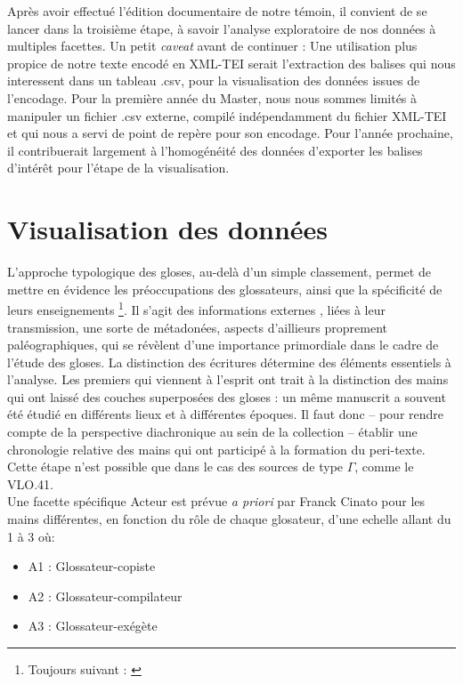 \documentclass[a4paper, twoside, 12pt]{book}
\begin{document}
Après avoir effectué l'édition documentaire de notre témoin, il convient de se lancer dans la troisième étape, à savoir l'analyse exploratoire de nos données à multiples facettes. Un petit \textit{caveat} avant de continuer : Une utilisation plus propice de notre texte encodé en XML-TEI serait l'extraction des balises qui nous interessent dans un tableau .csv, pour la visualisation des données issues de l'encodage. Pour la première année du Master, nous nous sommes limités à manipuler un fichier .csv externe, compilé indépendamment du fichier XML-TEI et qui nous a servi de point de repère pour son encodage. Pour l'année prochaine, il contribuerait largement à l'homogénéité des données d'exporter les balises d'intérêt pour l'étape de la visualisation.


\section{Visualisation des données}


L’approche typologique des gloses, au-delà d’un simple classement, permet de mettre en évidence les préoccupations des glossateurs, ainsi que la spécificité de leurs enseignements \footnote{Toujours suivant : \cite{cinato2011perspectives}}. Il s’agit des informations \og{} externes \fg{}, liées à leur transmission, une sorte de métadonées, aspects d'aillieurs proprement paléographiques, qui se révèlent d’une importance primordiale dans le cadre de l’étude des gloses. La distinction des écritures détermine des éléments essentiels à l’analyse. Les premiers qui viennent à l’esprit ont trait à la distinction des mains qui ont laissé des couches superposées des gloses : un même manuscrit a souvent été étudié en différents lieux et à différentes époques. Il faut donc – pour rendre compte de la perspective diachronique au sein de la collection – établir une chronologie relative des mains qui ont participé à la formation du peri-texte. Cette étape n’est possible que dans le cas des sources de type $\Gamma$, comme le VLO.41. \\

Une facette spécifique \og{} Acteur \fg{} est prévue \textit{a priori} par Franck Cinato pour les mains différentes, en fonction du rôle de chaque glosateur, d'une echelle allant du 1 à 3 où:

\begin{itemize}
    \item A1 : Glossateur-copiste
    \item A2 : Glossateur-compilateur
    \item A3 : Glossateur-exégète
\end{itemize}
\end{document}
